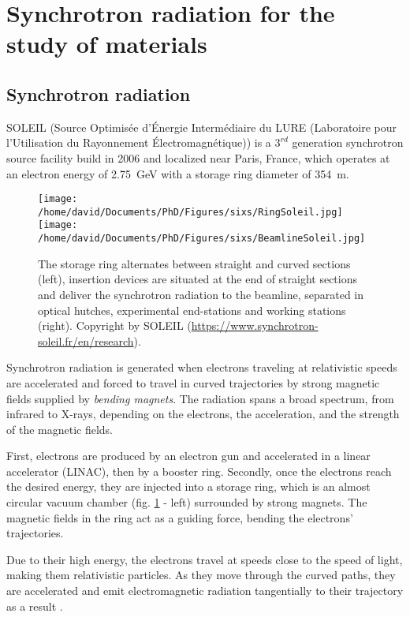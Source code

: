 \section{Synchrotron radiation for the study of materials} \label{sec:SIXS}

\subsection{Synchrotron radiation}

SOLEIL (Source Optimisée d’Énergie Intermédiaire du LURE (Laboratoire pour l’Utilisation du Rayonnement Électromagnétique)) is a $3^{rd}$ generation synchrotron source facility build in 2006 and localized near Paris, France, which operates at an electron energy of \qty{2.75}{\GeV} with a storage ring diameter of \qty{354}{\m}.

\begin{figure}[!htb]
    \centering
    \texttt{[image: /home/david/Documents/PhD/Figures/sixs/RingSoleil.jpg]}
    \texttt{[image: /home/david/Documents/PhD/Figures/sixs/BeamlineSoleil.jpg]}
    \caption{
    	The storage ring alternates between straight and curved sections (left), insertion devices are situated at the end of straight sections and deliver the synchrotron radiation to the beamline, separated in optical hutches, experimental end-stations and working stations (right).
    	Copyright by SOLEIL (\url{https://www.synchrotron-soleil.fr/en/research}).
    }
    \label{fig:SOLEIL}
\end{figure}

Synchrotron radiation is generated when electrons traveling at relativistic speeds are accelerated and forced to travel in curved trajectories by strong magnetic fields supplied by \textit{bending magnets}.
The radiation spans a broad spectrum, from infrared to X-rays, depending on the electrons, the acceleration, and the strength of the magnetic fields.

First, electrons are produced by an electron gun and accelerated in a linear accelerator (LINAC), then by a booster ring.
Secondly, once the electrons reach the desired energy, they are injected into a storage ring, which is an almost circular vacuum chamber (fig. \ref{fig:SOLEIL} - left) surrounded by strong magnets.
The magnetic fields in the ring act as a guiding force, bending the electrons' trajectories.

Due to their high energy, the electrons travel at speeds close to the speed of light, making them relativistic particles.
As they move through the curved paths, they are accelerated and emit electromagnetic radiation tangentially to their trajectory as a result \parencite{Willmott, NielsenMcMorrow}.

